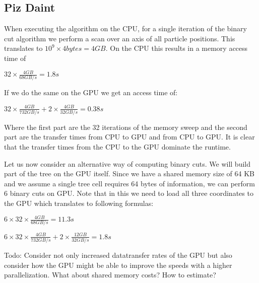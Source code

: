 \documentclass[]{article}
\begin{document}
\subsection{Piz Daint} 
When executing the algorithm on the CPU, for a single iteration of the binary cut algorithm we perform a scan over an axis of all particle positions. This translates to $10^9 \times 4 bytes = 4 GB$.
On the CPU this results in a memory access time of 
\begin{center}
	$32 \times \frac{ 4 GB}{68 GB/s} = 1.8 s$ 
\end{center}

If we do the same on the GPU we get an access time of:
\begin{center}
	$32 \times \frac{4 GB}{732 GB/s} + 2 \times \frac{4 GB}{32 GB/s} = 0.38 s$ 
\end{center}

Where the first part are the 32 iterations of the memory sweep and the second part are the transfer times from CPU to GPU and from CPU to GPU. It is clear that the transfer times from the CPU to the GPU dominate the runtime.

Let us now consider an alternative way of computing binary cuts. We will build part of the tree on the GPU itself. Since we have a shared memory size of 64 KB and we assume a single tree cell requires 64 bytes of information, we can perform 6 binary cuts on GPU. Note that in this we need to load all three coordinates to the GPU which translates to following formulas:

\begin{center}
	$6 \times 32 \times \frac{ 4 GB}{68 GB/s} = 11.3 s$ 
\end{center}

\begin{center}
	$6 \times 32 \times \frac{4 GB}{732 GB/s} + 2 \times \frac{12 GB}{32 GB/s} = 1.8 s$ 
\end{center}

Todo: Consider not only increased datatransfer rates of the GPU but also consider how the GPU might be able to improve the speeds with a higher parallelization.
What about shared memory costs? How to estimate?





\end{document}
